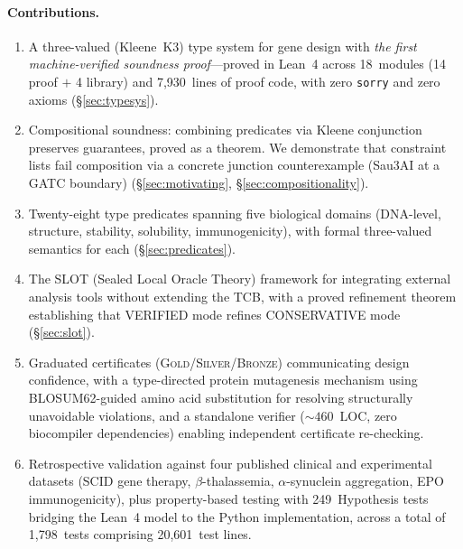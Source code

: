 \documentclass[acmsmall,review,anonymous]{acmart}
\newcommand{\GOLD}{\textsc{Gold}\xspace}
\newcommand{\SILVER}{\textsc{Silver}\xspace}
\newcommand{\BRONZE}{\textsc{Bronze}\xspace}
\begin{document}
\paragraph{Contributions.}
\begin{enumerate}[leftmargin=*,itemsep=1pt,topsep=2pt]
\item A three-valued (Kleene~K3) type system for gene design with
      \emph{the first machine-verified soundness proof}---proved in
      Lean~4 across 18~modules (14 proof $+$ 4 library) and
      7,930~lines of proof code, with zero \texttt{sorry} and zero
      axioms (\S\ref{sec:typesys}).

\item Compositional soundness: combining predicates via Kleene
      conjunction preserves guarantees, proved as a theorem.
      We demonstrate that constraint lists fail composition via a
      concrete junction counterexample (Sau3AI at a GATC boundary)
      (\S\ref{sec:motivating}, \S\ref{sec:compositionality}).

\item Twenty-eight type predicates spanning five biological domains
      (DNA-level, structure, stability, solubility, immunogenicity),
      with formal three-valued semantics for each
      (\S\ref{sec:predicates}).

\item The SLOT (Sealed Local Oracle Theory) framework for
      integrating external analysis tools without extending the TCB,
      with a proved refinement theorem establishing that VERIFIED mode
      refines CONSERVATIVE mode (\S\ref{sec:slot}).

\item Graduated certificates (\GOLD/\SILVER/\BRONZE) communicating
      design confidence, with a type-directed protein mutagenesis
      mechanism using BLOSUM62-guided amino acid substitution for
      resolving structurally unavoidable violations, and a standalone
      verifier (${\sim}460$~LOC, zero biocompiler dependencies)
      enabling independent certificate re-checking.

\item Retrospective validation against four published clinical and
      experimental datasets (SCID gene therapy, $\beta$-thalassemia,
      $\alpha$-synuclein aggregation, EPO immunogenicity), plus
      property-based testing with 249~Hypothesis tests bridging the
      Lean~4 model to the Python implementation, across a total of
      1,798~tests comprising 20,601~test lines.
\end{enumerate}
\end{document}
